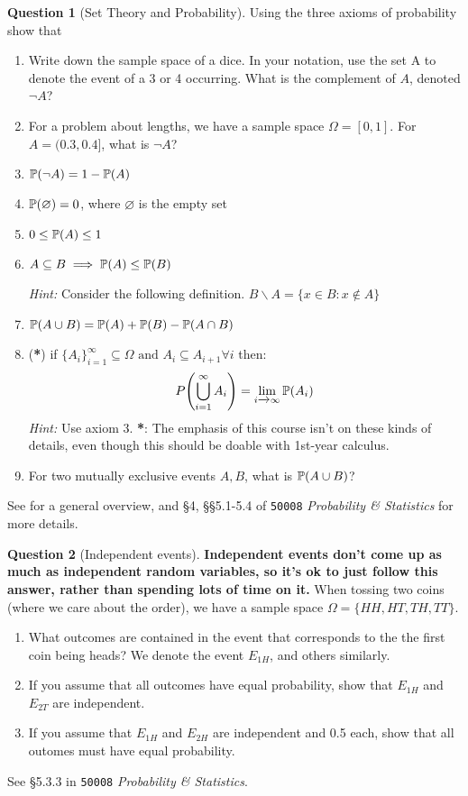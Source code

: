 \documentclass[a4paper]{article}
\theoremstyle{definition}
\newtheorem{question}{Question}
\newcommand{\courseprobstats}{\texttt{50008} \textit{Probability \& Statistics}}
\begin{document}
\begin{question}[Set Theory and Probability]
\label{q:setsprob}
Using the three axioms of probability show that
\begin{enumerate}[label=\alph*.]
    \item Write down the sample space of a dice. In your notation, use the set A to denote the event of a 3 or 4 occurring. What is the complement of $A$, denoted $\neg A$?
    \item For a problem about lengths, we have a sample space $\Omega = [0, 1]$. For $A = (0.3, 0.4]$, what is $\neg A$?
    \item $\prob{\neg  A} = 1 - \prob{A}$
    \item $\prob{\varnothing} = 0$, where $\varnothing$ is the empty set
    \item $0 \leq \prob{A} \leq 1$
    \item $A \subseteq B \implies \prob{A} \leq \prob{B}$
    
    \textit{Hint:} Consider the following definition. $B\backslash  A = \{x\in B: x\notin A\}$
    \item $\prob{A\cup B} = \prob{A} + \prob{B} - \prob{A\cap B}$
    \item (\textbf{*}) if $\{A_i\}_{i=1}^\infty \subseteq \Omega \text{ and } A_i \subseteq A_{i+1} \forall i$ then:
\[
P\left(\bigcup_{i=1}^{\infty} A_{i}\right) = \lim_{i\xrightarrow{}\infty} \prob{A_i}
\]
\textit{Hint:} Use axiom 3. \textbf{*}: The emphasis of this course isn't on these kinds of details, even though this should be doable with 1st-year calculus.
\item For two mutually exclusive events $A, B$, what is $\prob{A \cup B}$?
\end{enumerate}
See \citet[\S6.1.2]{mml} for a general overview, and \S4, \S\S5.1-5.4 of \courseprobstats{} for more details.
\end{question}

\begin{question}[Independent events] \textbf{Independent events don't come up as much as independent random variables, so it's ok to just follow this answer, rather than spending lots of time on it.}
When tossing two coins (where we care about the order), we have a sample space $\Omega = \{HH, HT, TH, TT\}$.
\begin{enumerate}[label=\alph*.]
    \item What outcomes are contained in the event that corresponds to the the first coin being heads? We denote the event $E_{1H}$, and others similarly.
    \item If you assume that all outcomes have equal probability, show that $E_{1H}$ and $E_{2T}$ are independent.
    \item If you assume that $E_{1H}$ and $E_{2H}$ are independent and 0.5 each, show that all outomes must have equal probability.
\end{enumerate}
See \S5.3.3 in \courseprobstats{}.
\end{question}
\end{document}
